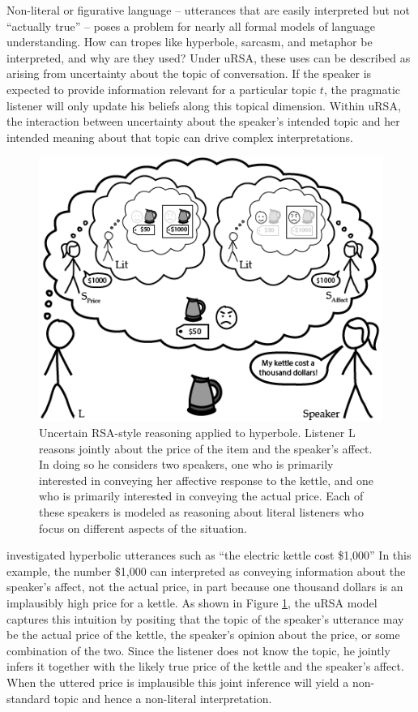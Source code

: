 \documentclass[]{elsarticle}
\begin{document}
Non-literal or figurative language -- utterances that are easily interpreted but not
``actually true'' -- poses a problem for nearly all formal models of language
understanding. How can tropes like
hyperbole, sarcasm, and metaphor be interpreted, and why are they used?
Under uRSA, these uses can be described as arising from uncertainty
about the topic of conversation. If the speaker is expected to provide
information relevant for a particular topic $t$,
the pragmatic listener will only update his beliefs along this topical
dimension. Within uRSA, the interaction between uncertainty about the speaker's
intended topic and her intended meaning about that topic can drive
complex interpretations.

\begin{figure}[ht]
\begin{center}
\includegraphics[width=1.0\textwidth]{images/media/image03.png}
\caption{\label{fig:ursa} Uncertain RSA-style reasoning applied to hyperbole. Listener L reasons jointly about the price of the item and the speaker's affect. In doing so he considers two speakers, one who is primarily interested in conveying her affective response to the kettle, and one who is primarily interested in conveying the actual price. Each of these speakers is modeled as reasoning about literal listeners who focus on different aspects of the situation.}
\end{center}
\end{figure}

\citet{kao2014} investigated hyperbolic utterances such as ``the
electric kettle cost \$1,000'' In this example, the number \$1,000 can
interpreted as conveying information about the speaker's affect, not the
actual price, in part because one thousand dollars is an implausibly
high price for a kettle. As shown in Figure \ref{fig:ursa}, the uRSA model  captures this intuition by positing that the topic of the speaker's
utterance may be the actual price of the kettle, the speaker's
opinion about the price, or some combination of the two. Since the listener
does not know the topic, he jointly infers it together with the
likely true price of the kettle and the speaker's affect. When the
uttered price is implausible this joint inference will yield a
non-standard topic and hence a non-literal interpretation.
\end{document}
